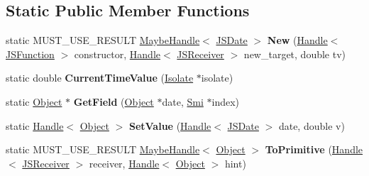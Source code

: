 \subsection*{Static Public Member Functions}
\begin{DoxyCompactItemize}
\item 
static M\+U\+S\+T\+\_\+\+U\+S\+E\+\_\+\+R\+E\+S\+U\+LT \hyperlink{classv8_1_1internal_1_1_maybe_handle}{Maybe\+Handle}$<$ \hyperlink{classv8_1_1internal_1_1_j_s_date}{J\+S\+Date} $>$ {\bfseries New} (\hyperlink{classv8_1_1internal_1_1_handle}{Handle}$<$ \hyperlink{classv8_1_1internal_1_1_j_s_function}{J\+S\+Function} $>$ constructor, \hyperlink{classv8_1_1internal_1_1_handle}{Handle}$<$ \hyperlink{classv8_1_1internal_1_1_j_s_receiver}{J\+S\+Receiver} $>$ new\+\_\+target, double tv)\hypertarget{classv8_1_1internal_1_1_j_s_date_ac3b1609096d2061caf9e0ce814ae879d}{}\label{classv8_1_1internal_1_1_j_s_date_ac3b1609096d2061caf9e0ce814ae879d}

\item 
static double {\bfseries Current\+Time\+Value} (\hyperlink{classv8_1_1internal_1_1_isolate}{Isolate} $\ast$isolate)\hypertarget{classv8_1_1internal_1_1_j_s_date_a953d857f4a4027129fc10cdf45f63400}{}\label{classv8_1_1internal_1_1_j_s_date_a953d857f4a4027129fc10cdf45f63400}

\item 
static \hyperlink{classv8_1_1internal_1_1_object}{Object} $\ast$ {\bfseries Get\+Field} (\hyperlink{classv8_1_1internal_1_1_object}{Object} $\ast$date, \hyperlink{classv8_1_1internal_1_1_smi}{Smi} $\ast$index)\hypertarget{classv8_1_1internal_1_1_j_s_date_aaab7884334a6c78e3ef03826ef904b92}{}\label{classv8_1_1internal_1_1_j_s_date_aaab7884334a6c78e3ef03826ef904b92}

\item 
static \hyperlink{classv8_1_1internal_1_1_handle}{Handle}$<$ \hyperlink{classv8_1_1internal_1_1_object}{Object} $>$ {\bfseries Set\+Value} (\hyperlink{classv8_1_1internal_1_1_handle}{Handle}$<$ \hyperlink{classv8_1_1internal_1_1_j_s_date}{J\+S\+Date} $>$ date, double v)\hypertarget{classv8_1_1internal_1_1_j_s_date_a98f1de1a5d8e4ada213e30bc94f149f8}{}\label{classv8_1_1internal_1_1_j_s_date_a98f1de1a5d8e4ada213e30bc94f149f8}

\item 
static M\+U\+S\+T\+\_\+\+U\+S\+E\+\_\+\+R\+E\+S\+U\+LT \hyperlink{classv8_1_1internal_1_1_maybe_handle}{Maybe\+Handle}$<$ \hyperlink{classv8_1_1internal_1_1_object}{Object} $>$ {\bfseries To\+Primitive} (\hyperlink{classv8_1_1internal_1_1_handle}{Handle}$<$ \hyperlink{classv8_1_1internal_1_1_j_s_receiver}{J\+S\+Receiver} $>$ receiver, \hyperlink{classv8_1_1internal_1_1_handle}{Handle}$<$ \hyperlink{classv8_1_1internal_1_1_object}{Object} $>$ hint)\hypertarget{classv8_1_1internal_1_1_j_s_date_af0251472b9c23270d1b3e27fe94d4a91}{}\label{classv8_1_1internal_1_1_j_s_date_af0251472b9c23270d1b3e27fe94d4a91}

\end{DoxyCompactItemize}
